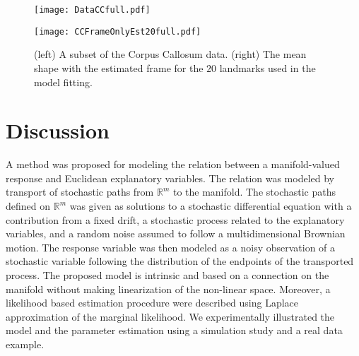 \documentclass[runningheads,a4paper]{llncs}
\newcommand{\R}{\mathbb R}
\begin{document}
\begin{figure}
\centering
\begin{minipage}{0.5\textwidth}
    \texttt{[image: DataCCfull.pdf]}
\end{minipage}%
\begin{minipage}{0.5\textwidth}
    \texttt{[image: CCFrameOnlyEst20full.pdf]}
\end{minipage}
\caption{(left) A subset of the Corpus Callosum data. (right) The mean shape with the estimated frame for the $20$ landmarks used in the model fitting.}
\label{fig:CCFrame}
\end{figure}



\section{Discussion}
\label{sec:Dis}

A method was proposed for modeling the relation between a manifold-valued response and Euclidean explanatory variables. The relation was modeled by transport of stochastic paths from $\R^m$ to the manifold. The stochastic paths defined on $\R^m$ was given as solutions to a stochastic differential equation with a contribution from a fixed drift, a stochastic process related to the explanatory variables, and a random noise assumed to follow a multidimensional Brownian motion. The response variable was then modeled as a noisy observation of a stochastic variable following the distribution of the endpoints of the transported process. The proposed model is intrinsic and based on a connection on the manifold without making linearization of the non-linear space. Moreover, a likelihood based estimation procedure were described using Laplace approximation of the marginal likelihood. We experimentally illustrated the model and the parameter estimation using a simulation study and a real data example.
 
\end{document}

